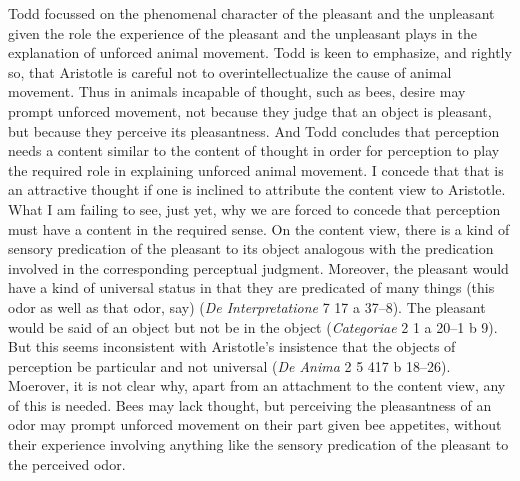 \documentclass[12pt]{article}
\begin{document}
Todd focussed on the phenomenal character of the pleasant and the unpleasant given the role the experience of the pleasant and the unpleasant plays in the explanation of unforced animal movement. Todd is keen to emphasize, and rightly so, that Aristotle is careful not to overintellectualize the cause of animal movement. Thus in animals incapable of thought, such as bees, desire may prompt unforced movement, not because they judge that an object is pleasant, but because they perceive its pleasantness. And Todd concludes that perception needs a content  similar to the content of thought in order for perception to play the required role in explaining unforced animal movement. I concede that that is an attractive thought if one is inclined to attribute the content view to Aristotle. What I am failing to see, just yet, why we are forced to concede that perception must have a content in the required sense. On the content view, there is a kind of sensory predication of the pleasant to its object analogous with the predication involved in the corresponding perceptual judgment. Moreover, the pleasant would have a kind of universal status in that they are predicated of many things (this odor as well as that odor, say) (\emph{De Interpretatione} 7 17 a 37--8). The pleasant would be said of an object but not be in the object (\emph{Categoriae} 2 1 a 20--1 b 9). But this seems inconsistent with Aristotle's insistence that the objects of perception be particular and not universal (\emph{De Anima} 2 5 417 b 18--26). Moerover, it is not clear why, apart from an attachment to the content view, any of this is needed. Bees may lack thought, but perceiving the pleasantness of an odor may prompt unforced movement on their part given bee appetites, without their experience involving anything like the sensory predication of the pleasant to the perceived odor.













\end{document}
